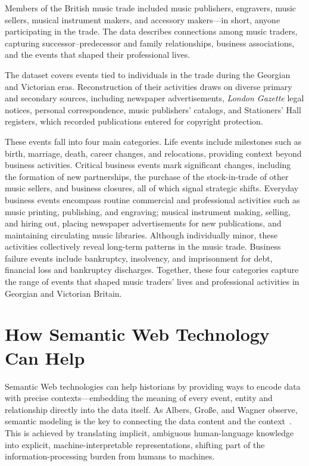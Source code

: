 \documentclass[final]{anthology-ch} %
\begin{document}
Members of the British music trade included music publishers, engravers, music sellers, musical instrument makers, and accessory makers---in short, anyone participating in the trade. The data describes connections among music traders, capturing successor--predecessor and family relationships, business associations, and the events that shaped their professional lives.

The dataset covers events tied to individuals in the trade during the Georgian and Victorian eras. Reconstruction of their activities draws on diverse primary and secondary sources, including newspaper advertisements, \textit{London Gazette} legal notices, personal correspondence, music publishers' catalogs, and Stationers' Hall registers, which recorded publications entered for copyright protection.

These events fall into four main categories. Life events include milestones such as birth, marriage, death, career changes, and relocations, providing context beyond business activities. Critical business events mark significant changes, including the formation of new partnerships, the purchase of the stock-in-trade of other music sellers, and business closures, all of which signal strategic shifts. Everyday business events encompass routine commercial and professional activities such as music printing, publishing, and engraving; musical instrument making, selling, and hiring out, placing newspaper advertisements for new publications, and maintaining circulating music libraries. Although individually minor, these activities collectively reveal long-term patterns in the music trade. Business failure events include bankruptcy, insolvency, and imprisonment for debt, financial loss and bankruptcy discharges. Together, these four categories capture the range of events that shaped music traders' lives and professional activities in Georgian and Victorian Britain.

\section{How Semantic Web Technology Can Help} \label{sec:semweb}

Semantic Web technologies can help historians by providing ways to encode data with precise contexts---embedding the meaning of every event, entity and relationship directly into the data itself. As Albers, Große, and Wagner observe, semantic modeling is the key to connecting the data content and the context~\cite[239]{albers2020semantic}. This is achieved by translating implicit, ambiguous human-language knowledge into explicit, machine-interpretable representations, shifting part of the information-processing burden from humans to machines.
\end{document}
